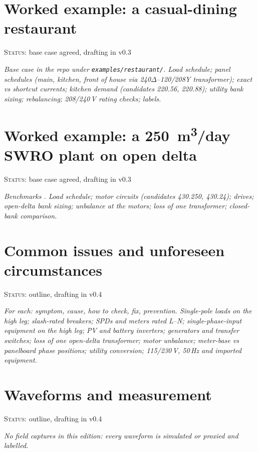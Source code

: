 \documentclass[11pt,a4paper]{article}
\newcommand{\plan}[1]{\par{\small\color{gray}\itshape #1}\par}
\newcommand{\status}[1]{{\small\color{orange!80!black}\textsc{Status:} #1}\par\medskip}
\begin{document}
\section{Worked example: a casual-dining restaurant}\label{sec:restaurant}
\status{base case agreed, drafting in v0.3}
\plan{Base case in the repo under \texttt{examples/restaurant/}. Load schedule; panel schedules (main, kitchen, front of house via 240$\Delta$--120/208Y transformer); exact vs shortcut currents; kitchen demand (candidates 220.56, 220.88); utility bank sizing; rebalancing; 208/240\,V rating checks; labels.}

\section{Worked example: a \SI{250}{m^3/day} SWRO plant on open delta}\label{sec:swro}
\status{base case agreed, drafting in v0.3}
\plan{Benchmarks \citep{infield2002swro}. Load schedule; motor circuits (candidates 430.250, 430.24); drives; open-delta bank sizing; unbalance at the motors; loss of one transformer; closed-bank comparison.}

\section{Common issues and unforeseen circumstances}\label{sec:issues}
\status{outline, drafting in v0.4}
\plan{For each: symptom, cause, how to check, fix, prevention. Single-pole loads on the high leg; slash-rated breakers; SPDs and meters rated L--N; single-phase-input equipment on the high leg; PV and battery inverters; generators and transfer switches; loss of one open-delta transformer; motor unbalance; meter-base vs panelboard phase positions; utility conversion; 115/230\,V, 50\,Hz and imported equipment.}

\section{Waveforms and measurement}\label{sec:waveforms}
\status{outline, drafting in v0.4}
\plan{No field captures in this edition: every waveform is simulated or proxied and labelled.}
\end{document}
